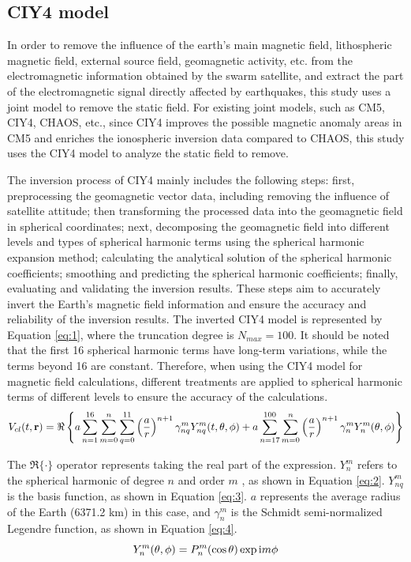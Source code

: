 \documentclass[3p,authoryear,preprint,12pt]{elsarticle}
\begin{document}
\subsection{CIY4 model}

{In order to remove the influence of the earth's main magnetic field, lithospheric magnetic field, external source field, geomagnetic activity, etc. from the electromagnetic information obtained by the swarm satellite, and extract the part of the electromagnetic signal directly affected by earthquakes, this study uses a joint model to remove the static field. For existing joint models, such as CM5, CIY4, CHAOS, etc., since CIY4 improves the possible magnetic anomaly areas in CM5 and enriches the ionospheric inversion data compared to CHAOS, this study uses the CIY4 model to analyze the static field to remove.}

The inversion process of CIY4 mainly includes the following steps: first, preprocessing the geomagnetic vector data, including removing the influence of satellite attitude; then transforming the processed data into the geomagnetic field in spherical coordinates; next, decomposing the geomagnetic field into different levels and types of spherical harmonic terms using the spherical harmonic expansion method; calculating the analytical solution of the spherical harmonic coefficients; smoothing and predicting the spherical harmonic coefficients; finally, evaluating and validating the inversion results. These steps aim to accurately invert the Earth's magnetic field information and ensure the accuracy and reliability of the inversion results.
\iffalse
The inverted CIY4 model is represented by Equation \ref{eq:1}, where the truncation degree is $N_{max}=100$. It should be noted that the first 16 spherical harmonic terms have long-term variations, while the terms beyond 16 are constant. Therefore, when using the CIY4 model for magnetic field calculations, different treatments are applied to spherical harmonic terms of different levels to ensure the accuracy of the calculations.
\begin{equation} 
	\label{eq:1}
	V_{cl}(t,\mathbf {r})=\Re \left\lbrace {a \sum _{n=1}^{16}\sum _{m=0}^n\sum _{q=0}^{11}\left({a\over r}\right)^{n+1} \gamma _{nq}^m Y_{nq}^m(t,\theta ,\phi )+a \sum _{n=17}^{100}\sum _{m=0}^n\left({a\over r}\right)^{n+1} \gamma _n^m Y_n^m(\theta ,\phi )}\right\rbrace 
\end{equation} 

The $\Re\{ \cdot \}$  operator represents taking the real part of the expression. $Y_n^m$  refers to the spherical harmonic of degree  $n$ and order $m$ , as shown in Equation \ref{eq:2}. $Y_{nq}^m$  is the basis function, as shown in Equation \ref{eq:3}. $a$  represents the average radius of the Earth (6371.2 km) in this case, and  $\gamma _n^m$ is the Schmidt semi-normalized Legendre function, as shown in Equation \ref{eq:4}.
\begin{equation} 
	\label{eq:2}
	Y_n^m(\theta ,\phi )=P_n^m(\cos {\theta })\exp {{\rm i}m\phi }
\end{equation} 
\end{document}
